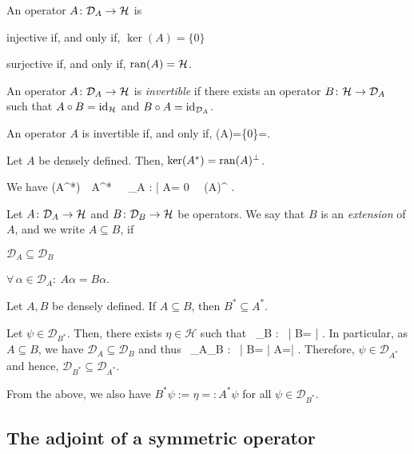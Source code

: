 \bp
An operator $A\colon \mathcal{D}_A\to \mathcal{H}$ is
\ben[label=(\roman*)]
\item injective if, and only if, $\ker(A)=\{0\}$
\item surjective if, and only if, $\operatorname{ran}(A)=\mathcal{H}$.
\een
\ep

\bd
An operator $A\colon \mathcal{D}_A\to \mathcal{H}$ is \emph{invertible} if there exists an operator $B\colon\mathcal{H}\to \mathcal{D}_A$ such that $A\circ B = \operatorname{id}_{\mathcal{H}}$ and $B\circ A = \operatorname{id}_{\mathcal{D}_A}$.
\ed

\bp
An operator $A$ is invertible if, and only if, 
\bse
\ker(A)=\{0\}\quad {}\quad {}=.
\ese
\ep

\bp
Let $A$ be densely defined. Then, $\ker(A^*)=\operatorname{ran}(A)^{\perp}$.
\ep

\bq
We have
\bse
\psi\in\ker(A^*)\ \Leftrightarrow \ A^*\ \Leftrightarrow \ \forall \, \alpha \in {}_A : \langle \psi | A\alpha \rangle = 0 \ \Leftrightarrow \ \psi \in \ran(A)^{\perp} .\qedhere
\ese
\eq

\bd
Let $A\colon \mathcal{D}_A \to \mathcal{H}$ and $B\colon \mathcal{D}_B \to \mathcal{H}$ be operators. We say that $B$ is an \emph{extension} of $A$, and we write $A\subseteq B$, if
\ben[label=(\roman*)]
\item $\mathcal{D}_{A}\subseteq \mathcal{D}_{B}$
\item $\forall \, \alpha \in \mathcal{D}_{A} : \ A\alpha = B \alpha$.
\een
\ed

\bp
\label{prp:adjointreverse}
Let $A,B$ be densely defined. If $A\subseteq B$, then $B^*\subseteq A^*$.
\ep

\bq
\ben[label=(\roman*)]
\item Let $\psi \in \mathcal{D}_{B^*}$. Then, there exists $\eta\in\mathcal{H}$ such that
\bse
\forall \, \beta \in {}_B : \ \langle \psi | B\beta \rangle = \langle \eta | \beta \rangle.
\ese
In particular, as $A\subseteq B$, we have $\mathcal{D}_A\subseteq\mathcal{D}_B$ and thus
\bse
\forall \, \alpha \in {}_A\subseteq{}_B : \ \langle \psi | B\alpha \rangle = \langle \psi | A\alpha \rangle =\langle \eta | \alpha \rangle.
\ese
Therefore, $\psi \in \mathcal{D}_{A^*}$ and hence, $\mathcal{D}_{B^*}\subseteq \mathcal{D}_{A^*}$.
\item From the above, we also have $B^*\psi := \eta =: A^*\psi$ for all $\psi \in \mathcal{D}_{B^*}$.\qedhere
\een
\eq


\subsection{The adjoint of a symmetric operator}


